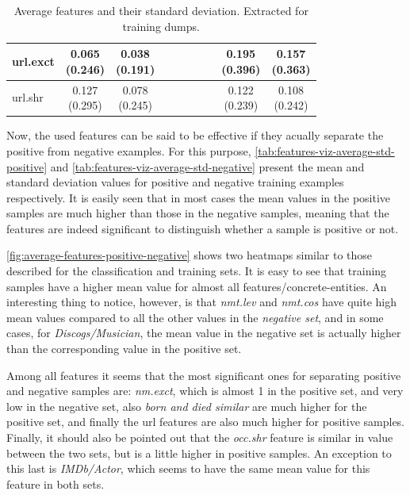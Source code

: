 \documentclass[epsfig,a4paper,11pt,titlepage,twoside,openany]{book}
\begin{document}
\begin{table}[h]
\begin{tabular}{l|c|c|c|c|c|c|c|c|c|}
\multicolumn{1}{|l|}{url.exct}                           & \makecell{0.065 \\ (0.246)}  & \makecell{0.038 \\ (0.191)} &              &              &              &              &              & \makecell{0.195 \\ (0.396)}    & \makecell{0.157 \\ (0.363)}   \\ \hline
\multicolumn{1}{|l|}{url.shr}                  & \makecell{0.127 \\ (0.295)}  & \makecell{0.078 \\ (0.245)} &              &              &              &              &              & \makecell{0.122 \\ (0.239)}    & \makecell{0.108 \\ (0.242)}   \\ \hline
\end{tabular}
\caption{Average features and their standard deviation. Extracted for training dumps.}
\label{tab:features-viz-average-std-training}
\end{table}


Now, the used features can be said to be effective if they acually separate the positive from negative examples. For this purpose, \autoref{tab:features-viz-average-std-positive} and \autoref{tab:features-viz-average-std-negative} present the mean and standard deviation values for positive and negative training examples respectively. It is easily seen that in most cases the mean values in the positive samples are much higher than those in the negative samples, meaning that the features are indeed significant to distinguish whether a sample is positive or not.
 
\autoref{fig:average-features-positive-negative} shows two heatmaps similar to those described for the classification and training sets. It is easy to see that training samples have a higher mean value for almost all features/concrete-entities. An interesting thing to notice, however, is that \textit{nmt.lev} and \textit{nmt.cos} have quite high mean values compared to all the other values in the \textit{negative set}, and in some cases, for \textit{Discogs/Musician}, the mean value in the negative set is actually higher than the corresponding value in the positive set. 

Among all features it seems that the most significant ones for separating positive and negative samples are: \textit{nm.exct}, which is almost 1 in the positive set, and very low in the negative set, also \textit{born and died similar} are much higher for the positive set, and finally the url features are also much higher for positive samples. Finally, it should also be pointed out that the \textit{occ.shr} feature is similar in value between the two sets, but is a little higher in positive samples. An exception to this last is \textit{IMDb/Actor}, which seems to have the same mean value for this feature in both sets.
\end{document}
